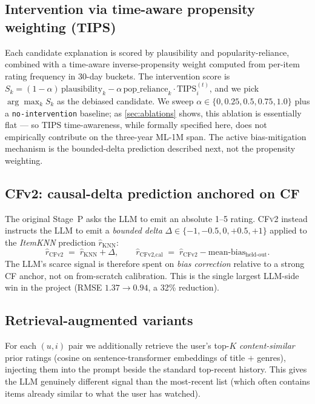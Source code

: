 \documentclass[11pt,a4paper]{article}
\begin{document}
\subsection{Intervention via time-aware propensity weighting (TIPS)}
Each candidate explanation is scored by plausibility and
popularity-reliance, combined with a time-aware inverse-propensity
weight computed from per-item rating frequency in 30-day buckets. The
intervention score is
$S_k = (1-\alpha)\,\text{plausibility}_k - \alpha\,\text{pop\_reliance}_k \cdot \text{TIPS}_i^{(t)}$,
and we pick $\arg\max_k S_k$ as the debiased candidate. We sweep
$\alpha \in \{0, 0.25, 0.5, 0.75, 1.0\}$ plus a \texttt{no-intervention}
baseline; as \cref{sec:ablations} shows, this ablation is essentially
flat --- so TIPS time-awareness, while formally specified here, does
not empirically contribute on the three-year ML-1M span. The active
bias-mitigation mechanism is the bounded-delta prediction described
next, not the propensity weighting.

\subsection{CFv2: causal-delta prediction anchored on CF}
The original Stage~P asks the LLM to emit an absolute 1--5 rating.
\textsc{CFv2} instead instructs the LLM to emit a \emph{bounded delta}
$\Delta \in \{-1, -0.5, 0, +0.5, +1\}$ applied to the \emph{ItemKNN}
prediction $\hat{r}_{\text{KNN}}$:
\[
  \hat{r}_{\text{CFv2}} \;=\; \hat{r}_{\text{KNN}} + \Delta,
  \qquad
  \hat{r}_{\text{CFv2,cal}} \;=\; \hat{r}_{\text{CFv2}} - \text{mean-bias}_{\text{held-out}}.
\]
The LLM's scarce signal is therefore spent on \emph{bias correction}
relative to a strong CF anchor, not on from-scratch calibration. This
is the single largest LLM-side win in the project
(RMSE $1.37 \to 0.94$, a 32\% reduction).

\subsection{Retrieval-augmented variants}
For each $(u,i)$ pair we additionally retrieve the user's top-$K$
\emph{content-similar} prior ratings (cosine on sentence-transformer
embeddings of title $+$ genres), injecting them into the prompt beside the
standard top-recent history. This gives the LLM genuinely different
signal than the most-recent list (which often contains items already
similar to what the user has watched).
\end{document}
